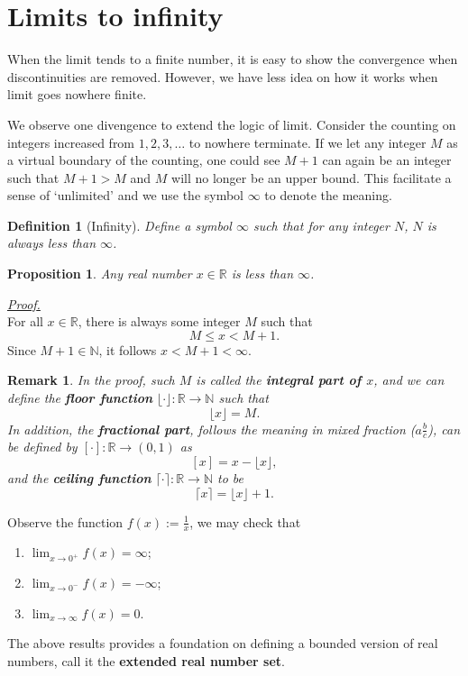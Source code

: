 \documentclass[12pt]{article}
\newtheorem{definition}{Definition}[section]
\newtheorem*{proposition}{Proposition}
\newtheorem*{remark}{Remark}
\renewenvironment{proof}[1][Proof]{\begin{snugshade*} \underline{\textit{{#1}.}}\\}{\hfill \qedsymbol \end{snugshade*}}
\begin{document}
    \section{Limits to infinity}

    When the limit tends to a finite number, it is easy to show the convergence when discontinuities are removed. However, we have less idea on how it works when limit goes nowhere finite.
    
    We observe one divengence to extend the logic of limit. Consider the counting on integers increased from $1,2,3,\dots$ to nowhere terminate. If we let any integer $M$ as a virtual boundary of the counting, one could see $M+1$ can again be an integer such that $M+1>M$ and $M$ will no longer be an upper bound. This facilitate a sense of `unlimited' and we use the symbol $\infty$ to denote the meaning.

    \begin{definition}[Infinity]
        Define a symbol $\infty$ such that for any integer $N$, $N$ is always less than $\infty$.
    \end{definition}

    \begin{proposition}
        Any real number $x\in\mathbb{R}$ is less than $\infty$.
    \end{proposition}

    \begin{proof}
        For all $x\in \mathbb{R}$, there is always some integer $M$ such that \[M\leq x< M+1.\] Since $M+1\in\mathbb{N}$, it follows $x<M+1<\infty$.
    \end{proof}

    \begin{remark}
        In the proof, such $M$ is called the \textbf{integral part of $x$}, and we can define the \textbf{floor function} $\lfloor \cdot \rfloor:\mathbb{R}\to\mathbb{N}$ such that \[\lfloor x \rfloor = M.\] In addition, the \textbf{fractional part}, follows the meaning in mixed fraction ($a\frac{b}{c}$), can be defined by $[\cdot]:\mathbb{R}\to (0,1)$ as \[[x]=x-\lfloor x \rfloor,\] and the \textbf{ceiling function} $\lceil \cdot \rceil:\mathbb{R}\to\mathbb{N}$ to be \[\lceil x \rceil=\lfloor x \rfloor + 1.\]
    \end{remark}

    Observe the function $f(x):=\frac{1}{x}$, we may check that \begin{enumerate}
        \item $\displaystyle \lim_{x\to 0^+}f(x)=\infty$;
        \item $\displaystyle \lim_{x\to 0^-}f(x)=-\infty$;
        \item $\displaystyle \lim_{x\to \infty}f(x)=0$.
    \end{enumerate}
    The above results provides a foundation on defining a bounded version of real numbers, call it the \textbf{extended real number set}.
\end{document}
